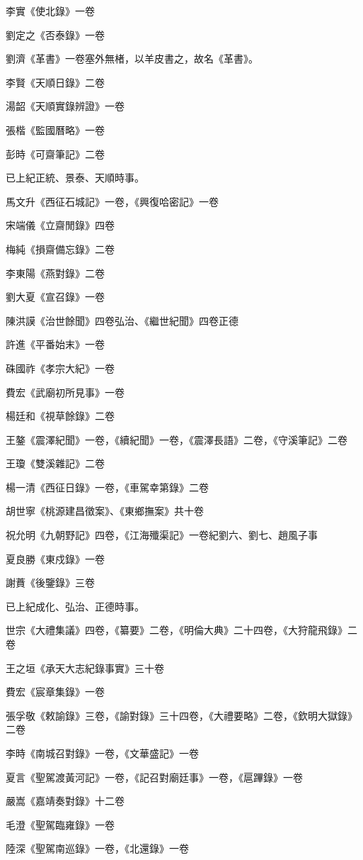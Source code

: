 李實《使北錄》一卷

劉定之《否泰錄》一卷

劉濟《革書》一卷塞外無楮，以羊皮書之，故名《革書》。

李賢《天順日錄》二卷

湯韶《天順實錄辨證》一卷

張楷《監國曆略》一卷

彭時《可齋筆記》二卷

已上紀正統、景泰、天順時事。

馬文升《西征石城記》一卷，《興復哈密記》一卷

宋端儀《立齋閒錄》四卷

梅純《損齋備忘錄》二卷

李東陽《燕對錄》二卷

劉大夏《宣召錄》一卷

陳洪謨《治世餘聞》四卷弘治、《繼世紀聞》四卷正德

許進《平番始末》一卷

硃國祚《孝宗大紀》一卷

費宏《武廟初所見事》一卷

楊廷和《視草餘錄》二卷

王鏊《震澤紀聞》一卷，《續紀聞》一卷，《震澤長語》二卷，《守溪筆記》二卷

王瓊《雙溪雜記》二卷

楊一清《西征日錄》一卷，《車駕幸第錄》二卷

胡世寧《桃源建昌徵案》、《東鄉撫案》共十卷

祝允明《九朝野記》四卷，《江海殲渠記》一卷紀劉六、劉七、趙風子事

夏良勝《東戍錄》一卷

謝蕡《後鑒錄》三卷

已上紀成化、弘治、正德時事。

世宗《大禮集議》四卷，《纂要》二卷，《明倫大典》二十四卷，《大狩龍飛錄》二卷

王之垣《承天大志紀錄事實》三十卷

費宏《宸章集錄》一卷

張孚敬《敕諭錄》三卷，《諭對錄》三十四卷，《大禮要略》二卷，《欽明大獄錄》二卷

李時《南城召對錄》一卷，《文華盛記》一卷

夏言《聖駕渡黃河記》一卷，《記召對廟廷事》一卷，《扈蹕錄》一卷

嚴嵩《嘉靖奏對錄》十二卷

毛澄《聖駕臨雍錄》一卷

陸深《聖駕南巡錄》一卷，《北還錄》一卷

